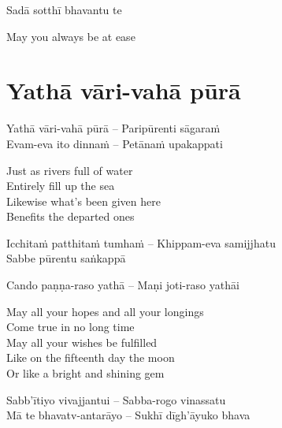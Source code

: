 Sadā sotthī bhavantu te

\begin{english}
  May you always be at ease
\end{english}



\setsecheadstyle{\subsectionFmt}
\section{Yathā vāri-vahā pūrā}
\label{yatha-vari-vaha-pura}

\begin{twochants}
  Yathā vāri-vahā pūrā – Paripūrenti sāgaraṁ\\
  Evam-eva ito dinnaṁ – Petānaṁ upakappati
\end{twochants}

\begin{english-verses}
  Just as rivers full of water\\
  Entirely fill up the sea\\
  Likewise what's been given here\\
  Benefits the departed ones
\end{english-verses}

\suttaRef{[Khp 1.7]}

\vspace{8pt}

\begin{pali-hangtogether}
  Icchitaṁ patthitaṁ tumhaṁ – Khippam-eva samijjhatu\\
  Sabbe pūrentu saṅkappā
\end{pali-hangtogether}
  Cando paṇṇa-raso yathā – Maṇi joti-raso yathāi

\begin{english-verses}
  May all your hopes and all your longings\\
  Come true in no long time\\
  May all your wishes be fulfilled\\
  Like on the fifteenth day the moon\\
  Or like a bright and shining gem
\end{english-verses}

\begin{twochants}
  Sabb'ītiyo vivajjantui – Sabba-rogo vinassatu\\
  Mā te bhavatv-antarāyo – Sukhī dīgh'āyuko bhava
\end{twochants}

